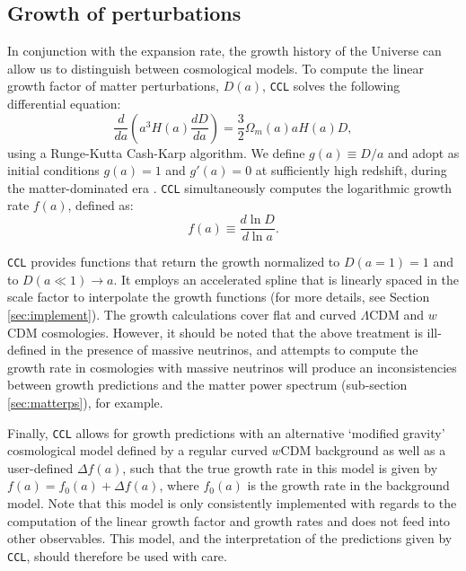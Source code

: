 \documentclass[\docopts]{\docclass}
\newcommand{\ccl}{{\tt CCL}\xspace}
\begin{document}
\subsection{Growth of perturbations}
\label{sec:growth}

In conjunction with the expansion rate, the growth history of the Universe can allow us to distinguish between cosmological models. To compute the linear growth factor of matter perturbations, $D(a)$, \ccl solves the following differential equation:
\begin{equation}
  \frac{d}{da}\left(a^3H(a)\frac{dD}{da}\right)=\frac{3}{2}\Omega_m(a)aH(a)D,
  \label{eq:growth}
\end{equation}
using a Runge-Kutta Cash-Karp algorithm. We define $g(a)\equiv D/a$ and adopt as initial conditions $g(a)=1$ and $g'(a)=0$ at sufficiently high redshift, during the matter-dominated era \citep{Cooray04}. \ccl simultaneously computes the logarithmic growth rate $f(a)$, defined as:
\begin{equation}
  f(a)\equiv \frac{d\ln D}{d\ln a}.
  \label{eq:lingrowthf}
\end{equation}

\ccl provides functions that return the growth normalized to $D(a=1)=1$ and to $D(a\ll1)\rightarrow a$. It employs an accelerated spline that is linearly spaced in the scale factor to interpolate the growth functions (for more details, see Section \ref{sec:implement}). The growth calculations cover flat and curved $\Lambda$CDM and $w$CDM cosmologies. However, it should be noted that the above treatment is ill-defined in the presence of massive neutrinos, and attempts to compute the growth rate in cosmologies with massive neutrinos will produce an inconsistencies between growth predictions and the matter power spectrum (sub-section \ref{sec:matterps}), for example.

Finally, \ccl allows for growth predictions with an alternative `modified gravity' cosmological model defined by a regular curved $w$CDM background as well as a user-defined $\Delta f(a)$, such that the true growth rate in this model is given by $f(a)=f_0(a)+\Delta f(a)$, where $f_0(a)$ is the growth rate in the background model. Note that this model is only consistently implemented with regards to the computation of the linear growth factor and growth rates and does not feed into other observables. This model, and the interpretation of the predictions given by \ccl, should therefore be used with care. 
\end{document}
